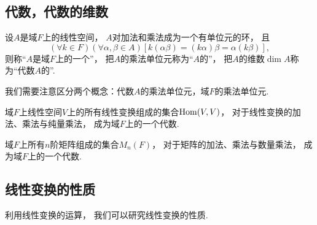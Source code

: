 \subsection{代数，代数的维数}
\begin{definition}
设\(A\)是域\(F\)上的线性空间，
\(A\)对加法和乘法成为一个有单位元的环，
且\[
	(\forall k\in F)
	(\forall\alpha,\beta\in A)
	[
		k(\alpha\beta)
		=(k\alpha)\beta
		=\alpha(k\beta)
	],
\]
则称“\(A\)是域\(F\)上的一个”，
把\(A\)的乘法单位元称为“\(A\)的”，
把\(A\)的维数\(\dim A\)称为“代数\(A\)的”.
\end{definition}
\begin{remark}
我们需要注意区分两个概念：代数\(A\)的乘法单位元，域\(F\)的乘法单位元.
\end{remark}

\begin{example}
域\(F\)上线性空间\(V\)上的所有线性变换组成的集合\(\operatorname{Hom}(V,V)\)，
对于线性变换的加法、乘法与纯量乘法，
成为域\(F\)上的一个代数.
\end{example}

\begin{example}
域\(F\)上所有\(n\)阶矩阵组成的集合\(M_n(F)\)，
对于矩阵的加法、乘法与数量乘法，
成为域\(F\)上的一个代数.
\end{example}

\subsection{线性变换的性质}
利用线性变换的运算，
我们可以研究线性变换的性质.

